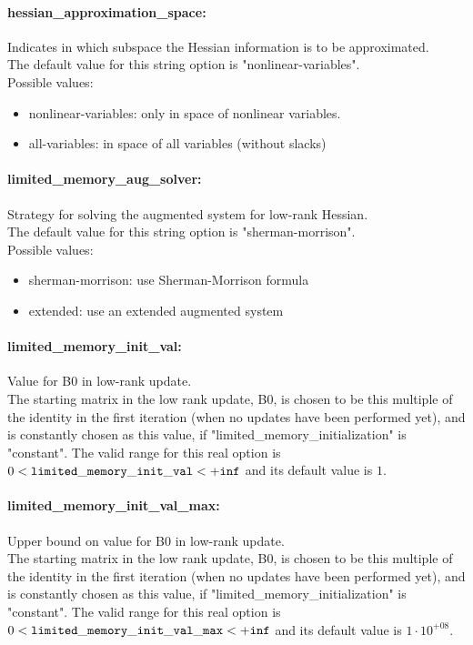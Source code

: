 \paragraph{hessian\_approximation\_space:}\label{opt:hessian_approximation_space} Indicates in which subspace the Hessian information is to be approximated. \\
 The default value for this string option is "nonlinear-variables".
\\ 
Possible values:
\begin{itemize}
   \item nonlinear-variables: only in space of nonlinear variables.
   \item all-variables: in space of all variables (without slacks)
\end{itemize}

\paragraph{limited\_memory\_aug\_solver:}\label{opt:limited_memory_aug_solver} Strategy for solving the augmented system for low-rank Hessian. \\
 The default value for this string option is "sherman-morrison".
\\ 
Possible values:
\begin{itemize}
   \item sherman-morrison: use Sherman-Morrison formula
   \item extended: use an extended augmented system
\end{itemize}

\paragraph{limited\_memory\_init\_val:}\label{opt:limited_memory_init_val} Value for B0 in low-rank update. \\
 The starting matrix in the low rank update, B0, is chosen to be this multiple of the identity in the first iteration (when no updates have been performed yet), and is constantly chosen as this value, if "limited\_memory\_initialization" is "constant". The valid range for this real option is 
$0 <  {\tt limited\_memory\_init\_val } <  {\tt +inf}$
and its default value is $1$.


\paragraph{limited\_memory\_init\_val\_max:}\label{opt:limited_memory_init_val_max} Upper bound on value for B0 in low-rank update. \\
 The starting matrix in the low rank update, B0, is chosen to be this multiple of the identity in the first iteration (when no updates have been performed yet), and is constantly chosen as this value, if "limited\_memory\_initialization" is "constant". The valid range for this real option is 
$0 <  {\tt limited\_memory\_init\_val\_max } <  {\tt +inf}$
and its default value is $1 \cdot 10^{+08}$.


